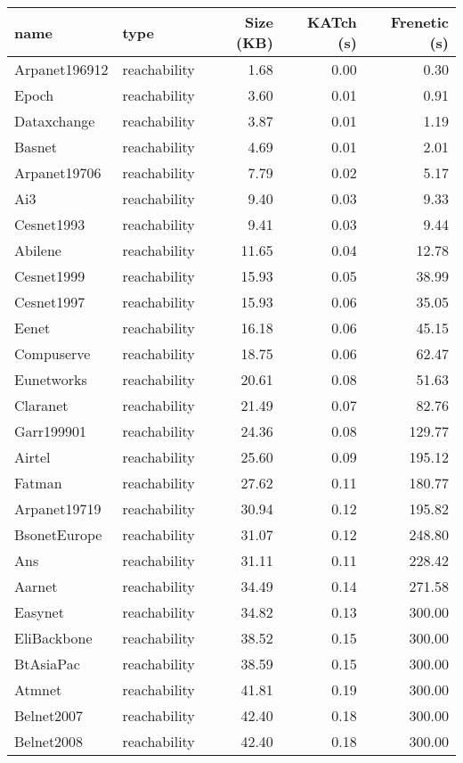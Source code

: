 \begin{tabular}{llrrr}
\toprule
name & type & Size (KB) & KATch (s) & Frenetic (s) \\
\midrule
Arpanet196912 & reachability & 1.68 & 0.00 & 0.30 \\
Epoch & reachability & 3.60 & 0.01 & 0.91 \\
Dataxchange & reachability & 3.87 & 0.01 & 1.19 \\
Basnet & reachability & 4.69 & 0.01 & 2.01 \\
Arpanet19706 & reachability & 7.79 & 0.02 & 5.17 \\
Ai3 & reachability & 9.40 & 0.03 & 9.33 \\
Cesnet1993 & reachability & 9.41 & 0.03 & 9.44 \\
Abilene & reachability & 11.65 & 0.04 & 12.78 \\
Cesnet1999 & reachability & 15.93 & 0.05 & 38.99 \\
Cesnet1997 & reachability & 15.93 & 0.06 & 35.05 \\
Eenet & reachability & 16.18 & 0.06 & 45.15 \\
Compuserve & reachability & 18.75 & 0.06 & 62.47 \\
Eunetworks & reachability & 20.61 & 0.08 & 51.63 \\
Claranet & reachability & 21.49 & 0.07 & 82.76 \\
Garr199901 & reachability & 24.36 & 0.08 & 129.77 \\
Airtel & reachability & 25.60 & 0.09 & 195.12 \\
Fatman & reachability & 27.62 & 0.11 & 180.77 \\
Arpanet19719 & reachability & 30.94 & 0.12 & 195.82 \\
BsonetEurope & reachability & 31.07 & 0.12 & 248.80 \\
Ans & reachability & 31.11 & 0.11 & 228.42 \\
Aarnet & reachability & 34.49 & 0.14 & 271.58 \\
Easynet & reachability & 34.82 & 0.13 & 300.00 \\
EliBackbone & reachability & 38.52 & 0.15 & 300.00 \\
BtAsiaPac & reachability & 38.59 & 0.15 & 300.00 \\
Atmnet & reachability & 41.81 & 0.19 & 300.00 \\
Belnet2007 & reachability & 42.40 & 0.18 & 300.00 \\
Belnet2008 & reachability & 42.40 & 0.18 & 300.00 \\

\end{tabular}
